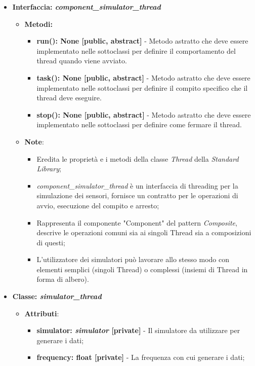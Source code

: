 \begin{itemize}
    \item{\textbf{Interfaccia: \textit{component\_simulator\_thread}}}
    \begin{itemize}
        \item \textbf{Metodi:}
        \begin{itemize}
            \item \textbf{run(): None [public, abstract]} - Metodo astratto che deve essere implementato nelle sottoclassi per definire il comportamento del thread quando viene avviato.
            \item \textbf{task(): None [public, abstract]} - Metodo astratto che deve essere implementato nelle sottoclassi per definire il compito specifico che il thread deve eseguire.
            \item \textbf{stop(): None [public, abstract]} - Metodo astratto che deve essere implementato nelle sottoclassi per definire come fermare il thread.
        \end{itemize}
        \item\textbf{Note}:
        \begin{itemize}
            \item Eredita le proprietà e i metodi della classe \textit{Thread} della \textit{Standard Library};
            \item \textit{component\_simulator\_thread} è un interfaccia di threading per la simulazione dei sensori, fornisce un contratto per le operazioni di avvio, esecuzione del compito e arresto;
            \item Rappresenta il componente "Component" del pattern \textit{Composite}, descrive le operazioni comuni sia ai singoli Thread sia a composizioni di questi;
            \item L'utilizzatore dei simulatori può lavorare allo stesso modo con elementi semplici (singoli Thread) o complessi (insiemi di Thread in forma di albero).
        \end{itemize}
    \end{itemize}
    \item{\textbf{Classe: \textit{simulator\_thread}}}
    \begin{itemize}
        \item\textbf{Attributi}:
        \begin{itemize}
            \item \textbf{simulator: \textit{simulator} [private]} - Il simulatore da utilizzare per generare i dati;
            \item \textbf{frequency: float [private]} - La frequenza con cui generare i dati;

\end{itemize}
\end{itemize}
\end{itemize}

